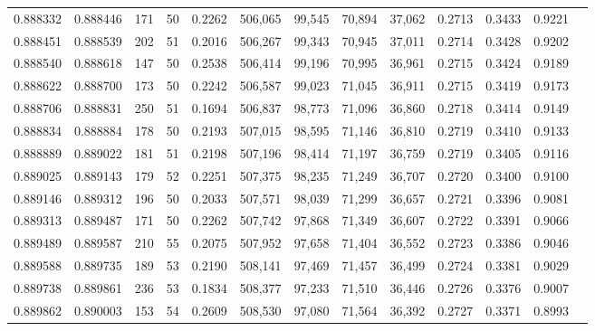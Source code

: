 \begin{tabular}{rrrrrrrrrrrrr}
0.888332 & 0.888446 &   171 &  50 &                                     0.2262 & 506,065 &  99,545 &  70,894 &  37,062 & 0.2713 & 0.3433 & 0.9221 \\
0.888451 & 0.888539 &   202 &  51 &                                     0.2016 & 506,267 &  99,343 &  70,945 &  37,011 & 0.2714 & 0.3428 & 0.9202 \\
0.888540 & 0.888618 &   147 &  50 &                                     0.2538 & 506,414 &  99,196 &  70,995 &  36,961 & 0.2715 & 0.3424 & 0.9189 \\
0.888622 & 0.888700 &   173 &  50 &                                     0.2242 & 506,587 &  99,023 &  71,045 &  36,911 & 0.2715 & 0.3419 & 0.9173 \\
0.888706 & 0.888831 &   250 &  51 &                                     0.1694 & 506,837 &  98,773 &  71,096 &  36,860 & 0.2718 & 0.3414 & 0.9149 \\
0.888834 & 0.888884 &   178 &  50 &                                     0.2193 & 507,015 &  98,595 &  71,146 &  36,810 & 0.2719 & 0.3410 & 0.9133 \\
0.888889 & 0.889022 &   181 &  51 &                                     0.2198 & 507,196 &  98,414 &  71,197 &  36,759 & 0.2719 & 0.3405 & 0.9116 \\
0.889025 & 0.889143 &   179 &  52 &                                     0.2251 & 507,375 &  98,235 &  71,249 &  36,707 & 0.2720 & 0.3400 & 0.9100 \\
0.889146 & 0.889312 &   196 &  50 &                                     0.2033 & 507,571 &  98,039 &  71,299 &  36,657 & 0.2721 & 0.3396 & 0.9081 \\
0.889313 & 0.889487 &   171 &  50 &                                     0.2262 & 507,742 &  97,868 &  71,349 &  36,607 & 0.2722 & 0.3391 & 0.9066 \\
0.889489 & 0.889587 &   210 &  55 &                                     0.2075 & 507,952 &  97,658 &  71,404 &  36,552 & 0.2723 & 0.3386 & 0.9046 \\
0.889588 & 0.889735 &   189 &  53 &                                     0.2190 & 508,141 &  97,469 &  71,457 &  36,499 & 0.2724 & 0.3381 & 0.9029 \\
0.889738 & 0.889861 &   236 &  53 &                                     0.1834 & 508,377 &  97,233 &  71,510 &  36,446 & 0.2726 & 0.3376 & 0.9007 \\
0.889862 & 0.890003 &   153 &  54 &                                     0.2609 & 508,530 &  97,080 &  71,564 &  36,392 & 0.2727 & 0.3371 & 0.8993 \\

\end{tabular}

